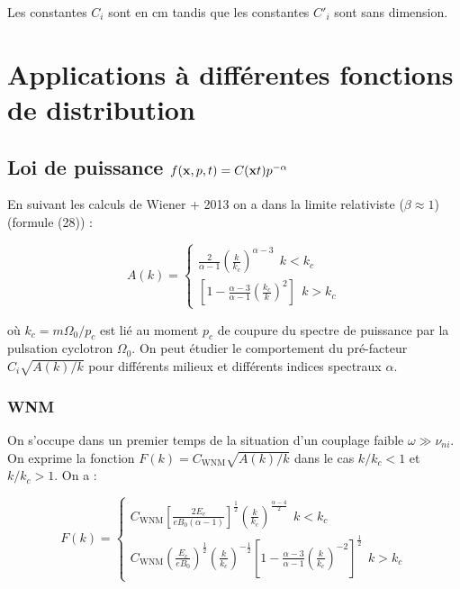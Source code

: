 \documentclass[10pt,a4paper]{article}
\begin{document}
Les constantes $C_i$ sont en $\mathrm{cm}$ tandis que les constantes $C'_i$ sont sans dimension. 

\section*{Applications à différentes fonctions de distribution} 

\subsection*{Loi de puissance $f(\vb{x}, p, t) = C(\vb{x} t) p^{-\alpha}$} 

En suivant les calculs de Wiener + 2013 on a dans la limite relativiste ($\beta \approx 1$) (formule (28)) : 

\begin{equation}
A(k) = \left\{
\begin{array}{rl}
  \frac{2}{\alpha - 1} \left( \frac{k}{k_c} \right)^{\alpha - 3} ~~ k < k_c \\
  \left[1 - \frac{\alpha - 3}{\alpha - 1} \left( \frac{k_c}{k} \right)^2 \right] ~~ k > k_c 
\end{array}
\right.
\end{equation}

où $k_c = m\Omega_0/p_c$ est lié au moment $p_c$ de coupure du spectre de puissance par la pulsation cyclotron $\Omega_0$. On peut étudier le comportement du pré-facteur $C_i \sqrt{A(k)/k}$ pour différents milieux et différents indices spectraux $\alpha$.

\subsubsection*{WNM}

On s'occupe dans un premier temps de la situation d'un couplage faible $\omega \gg \nu_{ni}$. On exprime la fonction $F(k) = C_\mathrm{WNM}\sqrt{A(k)/k}$ dans le cas $k/k_c < 1$ et $k/k_c > 1$. On a  : 

\begin{equation}
F(k) = \left\{
\begin{array}{rl}
  C_\mathrm{WNM} \left[\frac{2E_c}{eB_0(\alpha - 1)} \right]^{\frac{1}{2}} \left( \frac{k}{k_c} \right)^{\frac{\alpha - 4}{2}} ~~ k < k_c \\
  C_\mathrm{WNM} \left( \frac{E_c}{eB_0} \right)^\frac{1}{2} \left( \frac{k}{k_c} \right)^{-\frac{1}{2}} \left [ 1 - \frac{\alpha - 3}{\alpha - 1} \left( \frac{k}{k_c} \right)^{-2} \right]^{\frac{1}{2}} ~~ k > k_c 
\end{array}
\right.
\end{equation}
\end{document}
